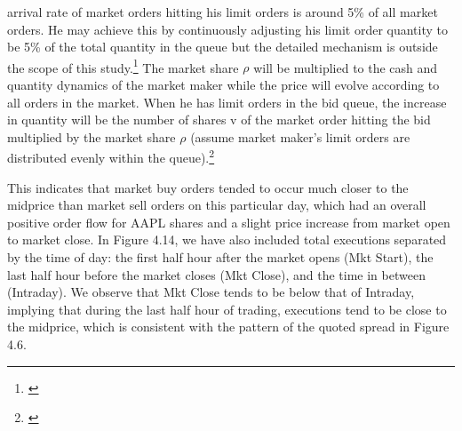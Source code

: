\documentclass[12pt,a4paper]{cau_thesis}
\begin{document}
arrival rate of market orders hitting his limit orders is around 5\%
of all market orders. He may achieve this by continuously adjusting
his limit order quantity to be 5\% of the total quantity in the queue
but the detailed mechanism is outside the scope of this
study.\footnote{\cite[See ][, p.61]{law2015pure}} The market share
$\rho$ will be multiplied to the cash and quantity dynamics of the
market maker while the price will evolve according to all orders in
the market. When he has limit orders in the bid queue, the increase
in quantity will be the number of shares v of the market order
hitting the bid multiplied by the market share $\rho$ (assume market
maker’s limit orders are distributed evenly within the
queue).\footnote{\cite[See ][, p.62]{law2015pure}}

This indicates that market buy orders tended to occur much closer to
the midprice than market sell orders on this particular day, which
had an overall positive order flow for AAPL shares and a slight price
increase from market open to market close. In Figure 4.14, we have
also included total executions separated by the time of day: the
first half hour after the market opens (Mkt Start), the last half
hour before the market closes (Mkt Close), and the time in between
(Intraday). We observe that Mkt Close tends to be below that of
Intraday, implying that during the last half hour of trading,
executions tend to be close to the midprice, which is consistent with
the pattern of the quoted spread in Figure 4.6.
\end{document}
